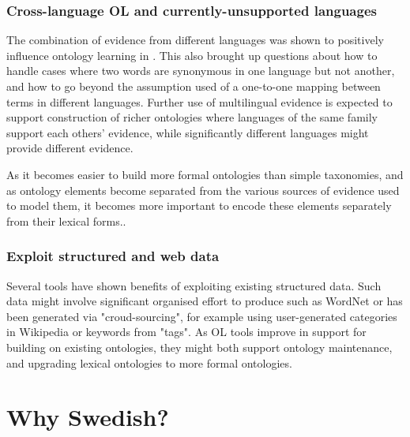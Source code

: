 \documentclass[a4paper]{report}
\begin{document}
\subsubsection{Cross-language OL and currently-unsupported languages}

The combination of evidence from different languages was shown to positively influence ontology learning in \cite{Hjelm09Thesis}.
This also brought up questions about how to handle cases where two words are synonymous in one language but not another, and how to go beyond the assumption used of a one-to-one mapping between terms in different languages\cite{Hjelm09Thesis}.
Further use of multilingual evidence is expected to support construction of richer ontologies where languages of the same family support each others' evidence, while significantly different languages might provide different evidence\cite{Hjelm09Thesis}.

As it becomes easier to build more formal ontologies than simple taxonomies, and as ontology elements become separated from the various sources of evidence used to model them, it becomes more important to encode these elements separately from their lexical forms.\cite{Wong11Survey}.

\subsubsection{Exploit structured and web data}

Several tools have shown benefits of exploiting existing structured data.
Such data might involve significant organised effort to produce such as WordNet\cite{Fellbaum98WordNet} or has been generated via "croud-sourcing", for example using user-generated categories in Wikipedia or keywords from "tags"\cite{Wong11Survey}.
As OL tools improve in support for building on existing ontologies, they might both support ontology maintenance, and upgrading lexical ontologies to more formal ontologies\cite{Wong11Survey}.

\section{Why Swedish?}
\label{sec:background:swedish}
\end{document}
